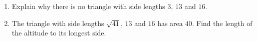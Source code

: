 \begin{enumerate}
\item[(a)] Explain why there is no triangle with side lengths $3$, $13$ and $16$.
\item[(b)] The triangle with side lengths $\sqrt{41}$, $13$ and $16$ has area $40$. Find the length of the altitude to its longest side.
\end{enumerate}
